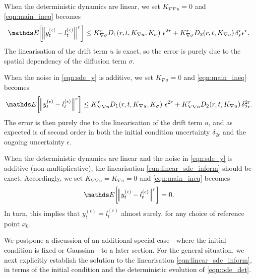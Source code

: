 \begin{remark}\label{rem:bound_linear}
	When the deterministic dynamics are linear, we set \(K_{\nabla\nabla u} = 0\) and \cref{eqn:main_ineq} becomes
	\[
		\avg{\norm{y_t^{(\epsilon)} - l_t^{(\epsilon)}}^r} \leq   K_{\nabla\sigma}^r D_1\!\left(r, t, K_{\nabla u}, K_\sigma\right)\, \epsilon^{2r} + K_{\nabla\sigma}^r D_3\!\left(r,t, K_{\nabla u}\right)\delta_r^r \epsilon^r.
	\]
	The linearisation of the drift term \(u\) is exact, so the error is purely due to the spatial dependency of the diffusion term \(\sigma\).
\end{remark}

\begin{remark}\label{rem:bound_additive}
	When the noise in \cref{eqn:sde_y} is additive, we set \(K_{\nabla\sigma} = 0\) and \cref{eqn:main_ineq} becomes
	\[
		\avg{\norm{y_t^{(\epsilon)} - l_t^{(\epsilon)}}^r} \leq   K_{\nabla\nabla u}^r D_1\!\left(r,t, K_{\nabla u}, K_\sigma\right)\, \epsilon^{2r} + K_{\nabla\nabla u}^r D_2\!\left(r,t, K_{\nabla u}\right)\delta_{2r}^{2r}.
	\]
	The error is then purely due to the linearisation of the drift term \(u\), and as expected is of second order in both the initial condition uncertainty \(\delta_{2r}\) and the ongoing uncertainty \(\epsilon\).
\end{remark}

\begin{remark}\label{rem:bound_exact}
	When the deterministic dynamics are linear and the noise in \cref{eqn:sde_y} is additive (non-multiplicative), the linearisation \cref{eqn:linear_sde_inform} should be exact.
	Accordingly, we set \(K_{\nabla\nabla u} = K_{\nabla\sigma} = 0\) and \cref{eqn:main_ineq} becomes
	\[
		\avg{\norm{y_t^{(\epsilon)} - l_t^{(\epsilon)}}^r} = 0.
	\]
	In turn, this implies that \(y_t^{(\epsilon)} = l_t^{(\epsilon)}\) almost surely, for any choice of reference point \(x_0\).
\end{remark}


We postpone a discussion of an additional special case---where the initial condition is fixed or
Gaussian---to a later section.  For the general situation,
we next explicitly establish the solution to the linearisation \cref{eqn:linear_sde_inform}, in terms of the initial condition and the deterministic evolution of \cref{eqn:ode_det}.

